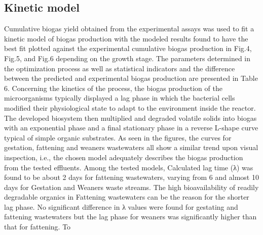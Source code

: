 \subsection{Kinetic model}
Cumulative biogas yield obtained from the experimental assays was used to fit a kinetic model of biogas production with the modeled results found to have the best fit plotted against the experimental cumulative biogas production in Fig.4, Fig.5, and Fig.6 depending on the growth stage. The parameters determined in the optimization process as well as statistical indicators and the difference between the predicted and experimental biogas production are presented in Table 6.
Concerning the kinetics of the process, the biogas production of the microorganisms typically displayed a lag phase in which the bacterial cells modified their physiological state to adapt to the environment inside the reactor. The developed biosystem then multiplied and degraded volatile solids into biogas with an exponential phase and a final stationary phase in a reverse L-shape curve typical of simple organic substrates. As seen in the figures, the curves for gestation, fattening and weaners wastewaters all show a similar trend upon visual inspection, i.e., the chosen model adequately describes the biogas production from the tested effluents. Among the tested models,  Calculated lag time (λ) was found to be about 2 days for fattening wastewaters, varying from 6 and almost 10 days for Gestation and Weaners waste streams. The high bioavailability of readily degradable organics in Fattening wastewaters can be the reason for the shorter lag phase. No significant difference in λ values were found for gestating and fattening wastewaters but the lag phase for weaners was significantly higher than that for fattening. To